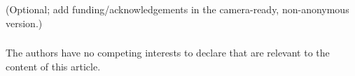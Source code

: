 \begin{credits}
\subsubsection{\ackname} (Optional; add funding/acknowledgements in the
camera-ready, non-anonymous version.)

\subsubsection{\discintname}
The authors have no competing interests to declare that are relevant to the
content of this article.
\end{credits}




